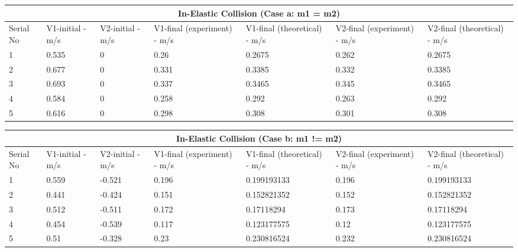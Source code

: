 \begin{center}
\begin{adjustbox}{width=1\textwidth}
\begin{tabular}{|l|l|l|l|l|l|l|}
\hline
\multicolumn{7}{|c|}{\textbf{In-Elastic Collision (Case a: m1 = m2)}} \\ \hline
Serial No & V1-initial - m/s & V2-initial - m/s & V1-final (experiment) - m/s & V1-final (theoretical) - m/s & V2-final (experiment) - m/s & V2-final (theoretical) - m/s \\ \hline
1     & 0.535    & 0    & 0.26     & 0.2675    & 0.262    & 0.2675    \\ \hline
2     & 0.677    & 0    & 0.331    & 0.3385    & 0.332    & 0.3385    \\ \hline
3     & 0.693    & 0    & 0.337    & 0.3465    & 0.345    & 0.3465    \\ \hline
4     & 0.584    & 0    & 0.258    & 0.292     & 0.263    & 0.292     \\ \hline
5     & 0.616    & 0    & 0.298    & 0.308     & 0.301    & 0.308     \\ \hline
\end{tabular}
\end{adjustbox}
\end{center}

\begin{center}
\begin{adjustbox}{width=1\textwidth}
\begin{tabular}{|l|l|l|l|l|l|l|}
\hline
\multicolumn{7}{|c|}{\textbf{In-Elastic Collision (Case b: m1 != m2)}} \\ \hline
Serial No & V1-initial - m/s & V2-initial - m/s & V1-final (experiment) - m/s & V1-final (theoretical) - m/s & V2-final (experiment) - m/s & V2-final (theoretical) - m/s \\ \hline
1   & 0.559  & -0.521  & 0.196  & 0.199193133  & 0.196  & 0.199193133  \\ \hline
2   & 0.441  & -0.424  & 0.151  & 0.152821352  & 0.152  & 0.152821352  \\ \hline
3   & 0.512  & -0.511  & 0.172  & 0.17118294   & 0.173  & 0.17118294   \\ \hline
4   & 0.454  & -0.539  & 0.117  & 0.123177575  & 0.12   & 0.123177575  \\ \hline
5   & 0.51   & -0.328  & 0.23   & 0.230816524  & 0.232  & 0.230816524  \\ \hline
\end{tabular}
\end{adjustbox}
\end{center}



